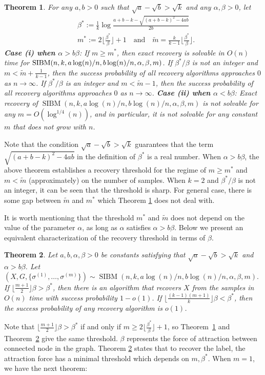 \documentclass[conference]{IEEEtran}
\newtheorem{theorem}{Theorem}%
\DeclareMathOperator{\SIBM}{SIBM}
\begin{document}
\begin{theorem} \label{thm:wt1}
For any $a,b> 0$ such that $\sqrt{a}-\sqrt{b}> \sqrt{k}$ and any $\alpha,\beta>0$, let
\begin{align} \label{eq:defstar}
&\beta^\ast := \frac{1}{k}
\log\frac{a+b-k-\sqrt{(a+b-k)^2-4ab}}{2 b}  \\
&m^\ast := 2 \Big\lfloor \frac{\beta^\ast}{\beta} \Big\rfloor +1 \text{~~~and~~~}
\tilde{m} = \frac{k}{k-1}\Big\lfloor \frac{\beta^\ast}{\beta} \Big\rfloor .
\end{align}
{\bf Case (i) when $\alpha>b\beta$}: If $m\ge m^\ast$, then exact recovery is solvable in $O(n)$ time for $\SIBM(n,k, a\log(n)/n, \linebreak[4] b\log(n)/n,\alpha,\beta,m)$.
If $\beta^\ast/\beta$ is not an integer and $m < \tilde{m} + \frac{1}{k-1}$, then the success probability of all recovery algorithms approaches $0$ as $n\to\infty$.
If $\beta^\ast/\beta$ is an integer and $m < \tilde{m} -1$, then the success probability of all recovery algorithms approaches $0$ as $n\to\infty$.
{\bf Case (ii) when $\alpha<b\beta$}: Exact recovery of $\SIBM(n,k, a\log(n)/n, b\log(n)/n,\alpha,\beta,m)$ is not solvable for any $m=O(\log^{1/4}(n))$, and in particular, it is not solvable for any constant $m$ that does not grow with $n$.
\end{theorem}
Note that the condition $\sqrt{a}-\sqrt{b} > \sqrt{k}$ guarantees that the term $\sqrt{(a+b-k)^2-4ab}$ in the definition of $\beta^\ast$ is a real number.
When $\alpha > b \beta$,
the above theorem establishes a recovery threshold
for the regime of $m \geq m^\ast$ and $m < \tilde{m}$ (approximately) on the number of samples.
When $k=2$ and $\beta^\ast/\beta$ is not an integer, it can be seen that the threshold is sharp. For general case, there is some gap between $\tilde{m}$ and $m^\ast$
which Theorem \ref{thm:wt1} does not deal with.

It is worth mentioning that the threshold $m^\ast$ and $\tilde{m}$ does not depend on the value of the parameter $\alpha$, as long as $\alpha$ satisfies $\alpha>b\beta$.
Below we present an equivalent characterization of the recovery threshold in terms of $\beta$.
\begin{theorem} \label{thm:wt2}
	Let $a,b,\alpha,\beta> 0$ be constants satisfying that $\sqrt{a}-\sqrt{b} > \sqrt{k}$ and $\alpha>b\beta$. 
	Let 
	$
	(X,G,\{\sigma^{(1)},\dots,\sigma^{(m)}\}) \sim \SIBM(n, k, a\log(n)/n, b\log(n)/n,\alpha,\beta,m).
	$
	If $\lfloor \frac{m+1}{2} \rfloor \beta>\beta^\ast$, then there is an algorithm that recovers $X$ from the samples in $O(n)$ time with success probability $1-o(1)$. If $\lfloor \frac{(k-1)(m+1)}{k} \rfloor \beta <\beta^\ast$, then the success probability of any recovery algorithm is $o(1)$. 
\end{theorem}
Note that $\lfloor \frac{m+1}{2} \rfloor \beta>\beta^\ast$ if and only if $m\ge 2 \Big\lfloor \frac{\beta^\ast}{\beta} \Big\rfloor +1$, so Theorem~\ref{thm:wt1} and Theorem~\ref{thm:wt2} give the same threshold. $\beta$ represents the force of attraction between connected node in the graph. Theorem \ref{thm:wt2} states that
to recover the label, the attraction force has a minimal threshold which depends on $m, \beta^*$.
When $m=1$, we have the next theorem:
\end{document}
